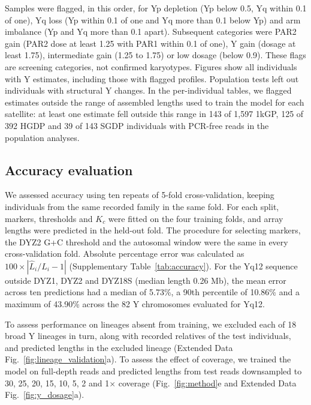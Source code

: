 Samples were flagged, in this order, for Yp depletion (Yp below 0.5, Yq within 0.1 of one), Yq loss (Yp within 0.1 of one and Yq more than 0.1 below Yp) and arm imbalance (Yp and Yq more than 0.1 apart). Subsequent categories were PAR2 gain (PAR2 dose at least 1.25 with PAR1 within 0.1 of one), Y gain (dosage at least 1.75), intermediate gain (1.25 to 1.75) or low dosage (below 0.9). These flags are screening categories, not confirmed karyotypes. Figures show all individuals with Y estimates, including those with flagged profiles. Population tests left out individuals with structural Y changes. In the per-individual tables, we flagged estimates outside the range of assembled lengths used to train the model for each satellite: at least one estimate fell outside this range in 143 of 1,597 1kGP, 125 of 392 HGDP and 39 of 143 SGDP individuals with PCR-free reads in the population analyses.

\subsection{Accuracy evaluation}\label{sec:m-benchmark}
We assessed accuracy using ten repeats of 5-fold cross-validation, keeping individuals from the same recorded family in the same fold. For each split, markers, thresholds and $K_c$ were fitted on the four training folds, and array lengths were predicted in the held-out fold. The procedure for selecting markers, the DYZ2 G+C threshold and the autosomal window were the same in every cross-validation fold. Absolute percentage error was calculated as $100 \times |\widehat L_i/L_i-1|$ (Supplementary Table~\ref{tab:accuracy}). For the Yq12 sequence outside DYZ1, DYZ2 and DYZ18S (median length 0.26 Mb), the mean error across ten predictions had a median of 5.73\%, a 90th percentile of 10.86\% and a maximum of 43.90\% across the 82 Y chromosomes evaluated for Yq12.

To assess performance on lineages absent from training, we excluded each of 18 broad Y lineages in turn, along with recorded relatives of the test individuals, and predicted lengths in the excluded lineage (Extended Data Fig.~\ref{fig:lineage_validation}a). To assess the effect of coverage, we trained the model on full-depth reads and predicted lengths from test reads downsampled to 30, 25, 20, 15, 10, 5, 2 and 1$\times$ coverage (Fig.~\ref{fig:method}e and Extended Data Fig.~\ref{fig:y_dosage}a).

